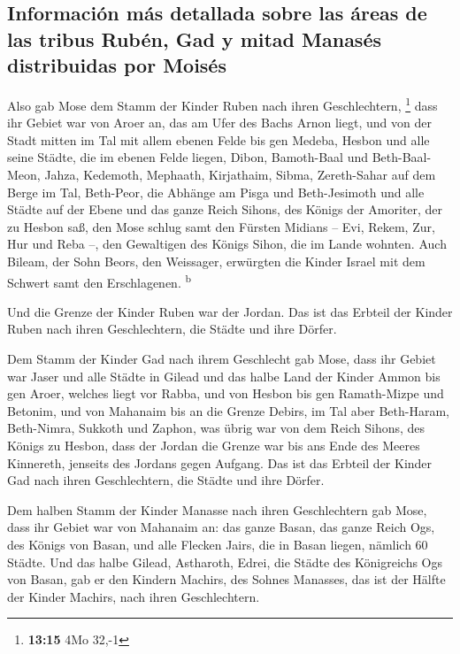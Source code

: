 \hypertarget{informaciuxf3n-muxe1s-detallada-sobre-las-uxe1reas-de-las-tribus-rubuxe9n-gad-y-mitad-manasuxe9s-distribuidas-por-moisuxe9s}{%
\subsection{Información más detallada sobre las áreas de las tribus
Rubén, Gad y mitad Manasés distribuidas por
Moisés}\label{informaciuxf3n-muxe1s-detallada-sobre-las-uxe1reas-de-las-tribus-rubuxe9n-gad-y-mitad-manasuxe9s-distribuidas-por-moisuxe9s}}

 Also gab Mose dem Stamm der Kinder Ruben nach ihren
Geschlechtern, \footnote{\textbf{13:15} 4Mo 32,-1}  dass
ihr Gebiet war von Aroer an, das am Ufer des Bachs Arnon liegt, und von
der Stadt mitten im Tal mit allem ebenen Felde bis gen Medeba,
 Hesbon und alle seine Städte, die im ebenen Felde
liegen, Dibon, Bamoth-Baal und Beth-Baal-Meon,  Jahza,
Kedemoth, Mephaath,  Kirjathaim, Sibma, Zereth-Sahar auf
dem Berge im Tal,  Beth-Peor, die Abhänge am Pisga und
Beth-Jesimoth  und alle Städte auf der Ebene und das
ganze Reich Sihons, des Königs der Amoriter, der zu Hesbon saß, den Mose
schlug samt den Fürsten Midians -- Evi, Rekem, Zur, Hur und Reba --, den
Gewaltigen des Königs Sihon, die im Lande wohnten.  Auch
Bileam, der Sohn Beors, den Weissager, erwürgten die Kinder Israel mit
dem Schwert samt den Erschlagenen. \textsuperscript{b}

 Und die Grenze der Kinder Ruben war der Jordan. Das ist
das Erbteil der Kinder Ruben nach ihren Geschlechtern, die Städte und
ihre Dörfer.

 Dem Stamm der Kinder Gad nach ihrem Geschlecht gab Mose,
 dass ihr Gebiet war Jaser und alle Städte in Gilead und
das halbe Land der Kinder Ammon bis gen Aroer, welches liegt vor Rabba,
 und von Hesbon bis gen Ramath-Mizpe und Betonim, und von
Mahanaim bis an die Grenze Debirs,  im Tal aber
Beth-Haram, Beth-Nimra, Sukkoth und Zaphon, was übrig war von dem Reich
Sihons, des Königs zu Hesbon, dass der Jordan die Grenze war bis ans
Ende des Meeres Kinnereth, jenseits des Jordans gegen Aufgang.
 Das ist das Erbteil der Kinder Gad nach ihren
Geschlechtern, die Städte und ihre Dörfer.

 Dem halben Stamm der Kinder Manasse nach ihren
Geschlechtern gab Mose,  dass ihr Gebiet war von Mahanaim
an: das ganze Basan, das ganze Reich Ogs, des Königs von Basan, und alle
Flecken Jairs, die in Basan liegen, nämlich 60 Städte. 
Und das halbe Gilead, Astharoth, Edrei, die Städte des Königreichs Ogs
von Basan, gab er den Kindern Machirs, des Sohnes Manasses, das ist der
Hälfte der Kinder Machirs, nach ihren Geschlechtern.

